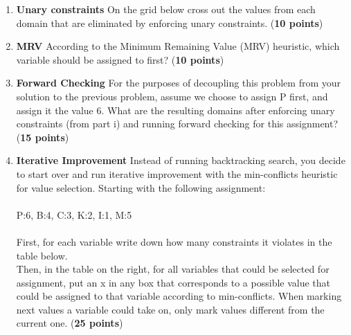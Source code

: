 \begin{enumerate}
  \item {\bf Unary constraints} On the grid below cross out the values from each domain that are eliminated by enforcing unary constraints. (\textbf{10 points})

\vspace{3cm}

\item {\bf MRV}
According to the Minimum Remaining Value (MRV) heuristic, which variable should be assigned to first? (\textbf{10 points})

\vspace{1cm}


\item {\bf Forward Checking}
For the purposes of decoupling this problem from your solution to the
previous problem, assume we choose to assign P first, and assign it the value 6. What are the resulting domains after enforcing unary constraints (from part i) and running forward checking for this assignment? (\textbf{15 points})

\newpage


\item {\bf Iterative Improvement}
Instead of running backtracking search, you decide to start over and run
iterative improvement with the min-conflicts heuristic for value selection. Starting with the following assignment:\\\\
P:6, B:4, C:3, K:2, I:1, M:5\\\\
First, for each variable write down how many constraints it violates in the table below.\\
Then, in the table on the right, for all variables that could be selected for assignment, put an x in any box that corresponds to a possible value that could be assigned to that variable according to min-conflicts. When marking next values a variable could take on, only mark values different from the current one. (\textbf{25 points})


\end{enumerate}
